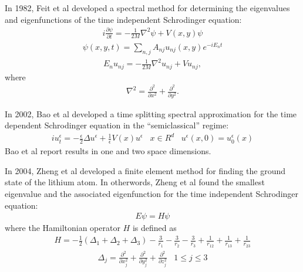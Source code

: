 \documentclass[]{article}
\begin{document}
In 1982, Feit et al\cite{FEIT1982412} developed a spectral
method for determining the eigenvalues and eigenfunctions of 
the time independent Schrodinger equation:
\begin{eqnarray}
i\frac{\partial\psi}{\partial t}=-\frac{1}{2M}\nabla^{2}\psi+V(x,y)\psi
\end{eqnarray}
\begin{eqnarray}
\psi(x,y,t)=\sum_{n,j}A_{nj}u_{nj}(x,y)e^{-i E_{n}t}
\end{eqnarray}
\begin{eqnarray}
E_{n}u_{nj}=-\frac{1}{2M}\nabla^{2}u_{nj}+Vu_{nj},
\end{eqnarray}
where
\begin{eqnarray}
\nabla^{2}=\frac{\partial^{2}}{\partial x^{2}}+
           \frac{\partial^{2}}{\partial y^{2}}.
\end{eqnarray}
\par\noindent
In 2002, Bao et al\cite{BAO2002487} developed a time splitting
spectral approximation for the time dependent Schrodinger equation
in the ``semiclassical'' regime:
\begin{eqnarray}
iu_{t}^{\epsilon}=-\frac{\epsilon}{2}\Delta u^{\epsilon}+
\frac{1}{\epsilon}V(x)u^{\epsilon} \hspace{10pt} x\in R^{d} \hspace{10pt}
u^{\epsilon}(x,0)=u_{0}^{\epsilon}(x)
\end{eqnarray}
Bao et al report results in one and two space dimensions.
\par\noindent
In 2004, Zheng et al\cite{zheng2004numerical} developed a finite element
method for finding the ground state of the lithium atom.  In otherwords,
Zheng et al found the smallest eigenvalue and the associated eigenfunction
for the time independent Schrodinger equation:
\begin{eqnarray}
E\psi=H\psi \label{time_independent}
\end{eqnarray}
where the Hamiltonian operator $H$ is defined as
\begin{eqnarray}
H=-\frac{1}{2}(\Delta_{1}+\Delta_{2}+\Delta_{3})-
\frac{3}{r_{1}}-
\frac{3}{r_{2}}-
\frac{3}{r_{3}}+
\frac{1}{r_{12}}+
\frac{1}{r_{13}}+
\frac{1}{r_{23}}
\end{eqnarray}
\begin{eqnarray}
\Delta_{j}=\frac{\partial^{2}}{\partial x_{j}^{2}}+ 
\frac{\partial^{2}}{\partial y_{j}^{2}}+ 
\frac{\partial^{2}}{\partial z_{j}^{2}} \hspace{10pt} 1\le j\le 3
\end{eqnarray}
\end{document}
